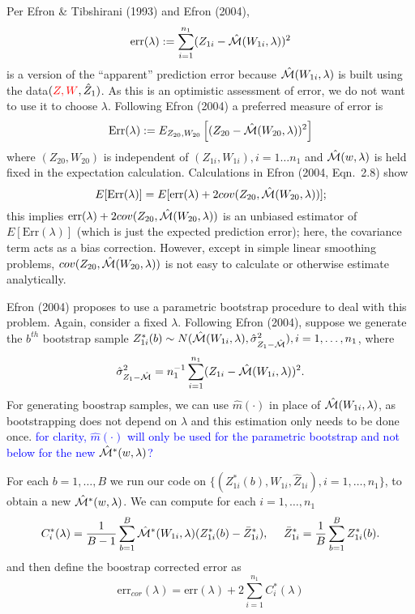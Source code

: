 \documentclass[12pt]{article}
\begin{document}
Per Efron \& Tibshirani (1993) and Efron (2004), 
\[
\mbox{err}(\lambda) := \sum_{i=1}^{n_1} ( Z_{1i} - \hat{\cal M}(W_{1i},\lambda))^2
\]
is a version of the ``apparent'' prediction error because
$\hat{\cal M}(W_{1i},\lambda)$ is built using the data$(\textcolor{red}{Z, W}, \hat Z_{1})$. As this is an optimistic assessment of
error, we do not want to use it to choose $\lambda$.  Following
Efron (2004) a preferred measure of error is
\[
\mbox{Err}(\lambda) := 
E_{Z_{20},W_{20}}\left[ (Z_{20} - \hat{\cal M}(W_{20},\lambda))^2 \right]
\]
where $(Z_{20},W_{20})$ is independent of 
$(Z_{1i}, W_{1i}), i = 1 \ldots n_1$ and 
$\hat{\cal M}(w,\lambda)$ is held fixed in the expectation
calculation.
Calculations in Efron (2004, Eqn.\ 2.8) show
\[
E[ \mbox{Err}(\lambda) ]
= E[ \mbox{err}(\lambda) + 2 cov(Z_{20},\hat{\cal M}(W_{20},\lambda))];
\]
this implies $\mbox{err}(\lambda) + 2
cov(Z_{20},\hat{\cal M}(W_{20},\lambda))$ is an unbiased estimator of $E[
  \mbox{Err}(\lambda) ]$ (which is just the expected prediction
error); here, the covariance term acts as a bias correction. However,
except in simple linear smoothing problems,
$cov(Z_{20},\hat{\cal M}(W_{20},\lambda))$ is not easy to calculate or
otherwise estimate analytically.

Efron (2004) proposes to use a parametric bootstrap procedure to deal
with this problem. Again, consider a fixed $\lambda$.  Following Efron
(2004), suppose we generate the $b^{th}$ bootstrap sample $Z_{1i}^*(b)
\sim N( \hat {\cal M}(W_{1i},\lambda), \hat \sigma^2_{Z_1-\hat{\cal M}} ), i = 1, \ldots, n_1$,
where
\begin{equation}
	\label{sigma_z1_calM}
	\hat \sigma^2_{Z_1-\hat{\cal M}} = n_1^{-1} \sum_{i=1}^{n_1} (Z_{1i}-\hat {\cal M}(W_{1i},\lambda))^2.
\end{equation}
For generating boostrap samples,  we can use $\hat m(\cdot)$ in place of $\hat {\cal M}(W_{1i},\lambda)$, as
bootstrapping does not depend on $\lambda$ and this estimation only needs to be done
once. \textcolor{blue}{for clarity, $\hat m(\cdot)$  will only be used for the parametric bootstrap and not below for the new  $\hat {\cal M}^*(w,\lambda)$?}

For each $b = 1,\ldots,B$ we run our code on $\{(Z^*_{1i}(b), W_{1i}, \hat Z_{1i}),
i=1,\ldots,n_1\}$, to obtain a new $\hat {\cal M}^*(w,\lambda)$.  We can
compute for each $i=1,\ldots,n_1$
\begin{equation}
	C^*_i(\lambda) = \frac{1}{B-1} \sum_{b=1}^B \hat {\cal M}^*(W_{1i},\lambda)
	(Z^*_{1i}(b) - \bar Z^*_{1i}), 
	~~~~\bar Z^*_{1i} = \frac{1}{B} \sum_{b=1}^B Z^*_{1i}(b).
\end{equation}
and then define the boostrap corrected error as
\begin{equation}
  \label{optcor}
  \mbox{err}_{cor}(\lambda)  = \mbox{err}(\lambda) + 2 \sum_{i=1}^{n_1} C^*_i(\lambda)
\end{equation}
\end{document}
